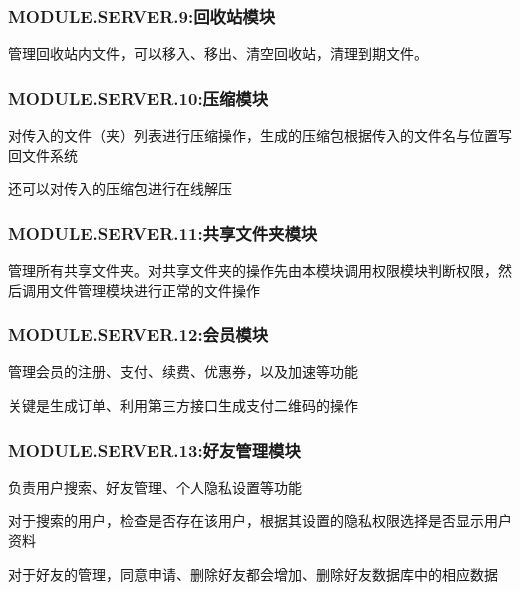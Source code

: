 \subsubsection{MODULE.SERVER.9:回收站模块}
管理回收站内文件，可以移入、移出、清空回收站，清理到期文件。

\subsubsection{MODULE.SERVER.10:压缩模块}
对传入的文件（夹）列表进行压缩操作，生成的压缩包根据传入的文件名与位置写回文件系统

还可以对传入的压缩包进行在线解压

\subsubsection{MODULE.SERVER.11:共享文件夹模块}
管理所有共享文件夹。对共享文件夹的操作先由本模块调用权限模块判断权限，然后调用文件管理模块进行正常的文件操作

{
\color{red}
\subsubsection{MODULE.SERVER.12:会员模块}
管理会员的注册、支付、续费、优惠券，以及加速等功能

关键是生成订单、利用第三方接口生成支付二维码的操作
\subsubsection{MODULE.SERVER.13:好友管理模块}
负责用户搜索、好友管理、个人隐私设置等功能

对于搜索的用户，检查是否存在该用户，根据其设置的隐私权限选择是否显示用户资料

对于好友的管理，同意申请、删除好友都会增加、删除好友数据库中的相应数据
}
    





